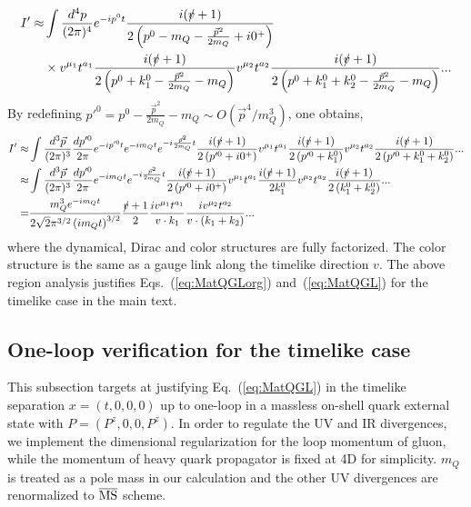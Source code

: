 \documentclass[a4paper,11pt]{article}
\begin{document}
\begin{align}
I' \approx & \int \frac{d^4 p}{(2\pi)^4} e^{-i p^0 t} \frac{i(\slashed{v}+1)}{2 \left(p^0 - m_{Q} - \frac{\vec{p}^2}{2 m_{Q}} + i 0^{+}\right)} \nonumber\\
&\times v^{\mu_1} t^{a_1} \frac{i(\slashed{v}+1)}{2\left(p^{0}+k_1^{0}-\frac{\vec{p}^2}{2 m_{Q}}-m_{Q}\right)} v^{\mu_2} t^{a_2} \frac{i(\slashed{v}+1)}{2\left(p^{0}+k_1^{0}+k_2^{0}-\frac{\vec{p}^2}{2 m_{Q}}-m_{Q}\right)} ...    
\end{align}
By redefining $p'^0 = p^0-\frac{\vec{p}^2}{2 m_{Q}}-m_{Q} \sim O\left(\vec{p}^4/m_{Q}^3\right)$, one obtains,
\begin{align}
I' \approx & \int \frac{d^3 \vec{p}}{(2\pi)^3} \frac{d p'^0}{2\pi} e^{-i p'^0 t} e^{-i m_{Q} t} e^{- i \frac{\vec{p}^2}{2 m_{Q}} t} \frac{i(\slashed{v}+1)}{2 \left(p'^0 + i 0^{+}\right)}  v^{\mu_1} t^{a_1} \frac{i(\slashed{v}+1)}{2\left(p'^0+k_1^{0}\right)} v^{\mu_2} t^{a_2} \frac{i(\slashed{v}+1)}{2\left(p'^{0}+k_1^{0}+k_2^{0}\right)} ...  \nonumber\\
\approx & \int \frac{d^3 \vec{p}}{(2\pi)^3} \frac{d p'^0}{2\pi} e^{-i m_{Q} t} e^{- i \frac{\vec{p}^2}{2 m_{Q}} t} \frac{i(\slashed{v}+1)}{2 \left(p'^0 + i 0^{+}\right)}  v^{\mu_1} t^{a_1} \frac{i(\slashed{v}+1)}{2 k_1^{0}} v^{\mu_2} t^{a_2} \frac{i(\slashed{v}+1)}{2\left(k_1^{0}+k_2^{0}\right)} ... \nonumber\\
= & \frac{m_Q^3 e^{-i m_Q t}}{2 \sqrt{2} \pi ^{3/2} \left(i m_Q t\right)^{3/2}} \frac{\slashed{v}+1}{2} \frac{i v^{\mu_1} t^{a_1}}{v \cdot k_1} \frac{i v^{\mu_2} t^{a_2}}{v \cdot (k_1 +k_2)} ...
\end{align}
where the dynamical, Dirac and color structures are fully factorized. The color structure is the same as a gauge link along the timelike direction $v$. The above region analysis justifies Eqs.~(\ref{eq:MatQGLorg}) and~(\ref{eq:MatQGL}) for the timelike case in the main text.


\subsection{One-loop verification for the timelike case}\label{sec:MatQGL1loop}
This subsection targets at justifying Eq.~(\ref{eq:MatQGL}) in the timelike separation $x=(t,0,0,0)$ up to one-loop in a massless on-shell quark external state with $P=(P^z,0,0,P^z)$. In order to regulate the UV and IR divergences, we implement the dimensional regularization for the loop momentum of gluon, while the momentum of heavy quark propagator is fixed at 4D for simplicity. $m_Q$ is treated as a pole mass in our calculation and the other UV divergences are renormalized to $\overline{\rm MS}$ scheme.  
\end{document}

